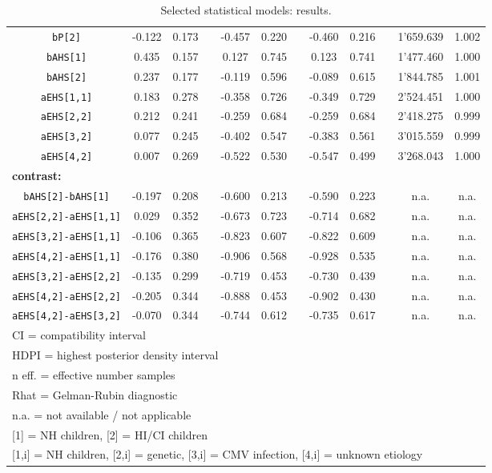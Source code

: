 \begin{table}[h!]
\begin{tabular}{|cccccccccccc|}
		\texttt{bP[2]} & -0.122 & 0.173 & & -0.457 & 0.220 & & -0.460 & 0.216 & & 1'659.639 & 1.002 \\
		\texttt{bAHS[1]} & 0.435 & 0.157 & & 0.127 & 0.745 & & 0.123 & 0.741 & & 1'477.460 & 1.000 \\
		\texttt{bAHS[2]} & 0.237 & 0.177 & & -0.119 & 0.596 & & -0.089 & 0.615 & & 1'844.785 & 1.001 \\
		\texttt{aEHS[1,1]} & 0.183 & 0.278 & & -0.358 & 0.726 & & -0.349 & 0.729 & & 2'524.451 & 1.000 \\
		\texttt{aEHS[2,2]} & 0.212 & 0.241 & & -0.259 & 0.684 & & -0.259 & 0.684 & & 2'418.275 & 0.999 \\
		\texttt{aEHS[3,2]} & 0.077 & 0.245 & & -0.402 & 0.547 & & -0.383 & 0.561 & & 3'015.559 & 0.999 \\
		\texttt{aEHS[4,2]} & 0.007 & 0.269 & & -0.522 & 0.530 & & -0.547 & 0.499 & & 3'268.043 & 1.000 \\
		\multicolumn{12}{|l|}{ \textbf{contrast:} } \\
		\texttt{bAHS[2]-bAHS[1]} & -0.197 & 0.208 & & -0.600 & 0.213 & & -0.590 & 0.223 & & n.a. & n.a. \\
		\texttt{aEHS[2,2]-aEHS[1,1]} & 0.029 & 0.352 & & -0.673 & 0.723 & & -0.714 & 0.682 & & n.a. & n.a. \\
		\texttt{aEHS[3,2]-aEHS[1,1]} & -0.106 & 0.365 & & -0.823 & 0.607 & & -0.822 & 0.609 & & n.a. & n.a. \\
		\texttt{aEHS[4,2]-aEHS[1,1]} & -0.176 & 0.380 & & -0.906 & 0.568 & & -0.928 & 0.535 & & n.a. & n.a. \\
		\texttt{aEHS[3,2]-aEHS[2,2]} & -0.135 & 0.299 & & -0.719 & 0.453 & & -0.730 & 0.439 & & n.a. & n.a. \\
		\texttt{aEHS[4,2]-aEHS[2,2]} & -0.205 & 0.344 & & -0.888 & 0.453 & & -0.902 & 0.430 & & n.a. & n.a. \\
		\texttt{aEHS[4,2]-aEHS[3,2]} & -0.070 & 0.344 & & -0.744 & 0.612 & & -0.735 & 0.617 & & n.a. & n.a. \\
		\hline
		\multicolumn{12}{l}{\footnotesize{CI = compatibility interval}} \\
		\multicolumn{12}{l}{\footnotesize{HDPI = highest posterior density interval}} \\
		\multicolumn{12}{l}{\footnotesize{n eff. = effective number samples}} \\
		\multicolumn{12}{l}{\footnotesize{Rhat = Gelman-Rubin diagnostic}} \\
		\multicolumn{12}{l}{\footnotesize{n.a. = not available / not applicable}} \\
		\multicolumn{12}{l}{\footnotesize{[1] = NH children, [2] = HI/CI children}} \\
		\multicolumn{12}{l}{\footnotesize{[1,i] = NH children, [2,i] = genetic, [3,i] = CMV infection, [4,i] = unknown etiology}} \\
	\end{tabular}
	\caption[Selected statistical models: results]{Selected statistical models: results.}
	\label{tab:results}
\end{table}

